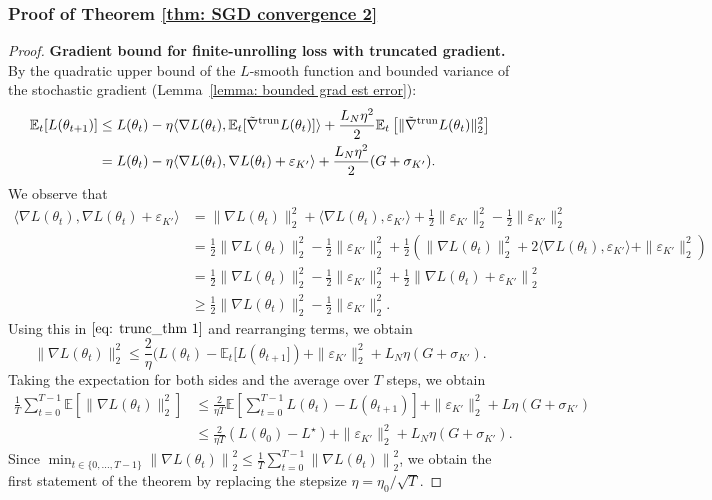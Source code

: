 \documentclass{article}
\def\E{\mathbb{E}}
\def\tgrad{\Tilde{\nabla}}
\def\trun{\mathrm{trun}}
\begin{document}
\subsubsection{Proof of Theorem \ref{thm: SGD convergence 2}}
\begin{proof}
    \textbf{Gradient bound for finite-unrolling loss with truncated gradient.}
    By the quadratic upper bound of the $L$-smooth function and bounded variance of the stochastic gradient (Lemma~\ref{lemma: bounded grad est error}):
    \begin{align}\label{eq: trunc_thm 1}
        \E_t [L(\theta_{t+1})] &\leq L(\theta_t) -\eta \langle \nabla L(\theta_t), \E_t[\tgrad^\trun L(\theta_t)] \rangle + \frac{L_N \eta^2}{2} \E_t \left[\| \tgrad^\trun L(\theta_t) \|^2_2\right] \nonumber\\
        &= L(\theta_t) -  \eta \langle \nabla L(\theta_t), \nabla L(\theta_t) + \varepsilon_{K'} \rangle + \frac{L_N \eta^2}{2} (G +\sigma_{K'}).
    \end{align}
    We observe that 
    \begin{align*}
        \langle \nabla L(\theta_t), \nabla L(\theta_t) + \varepsilon_{K'} \rangle
        &= \|\nabla L(\theta_t) \|^2_2 + \langle  \nabla L(\theta_t), \varepsilon_{K'} \rangle + \frac{1}{2}\|\varepsilon_{K'} \|^2_2 - \frac{1}{2}\|\varepsilon_{K'}\|^2_2\\
        &= \frac{1}{2}\|\nabla L(\theta_t) \|^2_2 - \frac{1}{2}\|\varepsilon_{K'}\|^2_2 + \frac{1}{2} \left(\|\nabla L(\theta_t) \|^2_2 + 2\langle  \nabla L(\theta_t), \varepsilon_{K'} \rangle +\|\varepsilon_{K'}\|^2_2 \right) \\
        &= \frac{1}{2}\|\nabla L(\theta_t) \|^2_2 - \frac{1}{2}\|\varepsilon_{K'}\|^2_2 + \frac{1}{2}\left\| \nabla L(\theta_t) + \varepsilon_{K'} \right\|^2_2\\
        &\geq \frac{1}{2}\|\nabla L(\theta_t) \|^2_2 - \frac{1}{2}\|\varepsilon_{K'}\|^2_2.
    \end{align*}
    Using this in $\eqref{eq: trunc_thm 1}$ and rearranging terms, we obtain 
    \[
    \| \nabla L(\theta_t) \|^2_2 \leq \frac{2}{\eta} (L (\theta_t) - \E_t[L(\theta_{t+1}]) + \| \varepsilon_{K'} \|^2_2 + L_N \eta (G + \sigma_{K'}).
    \]
    Taking the expectation for both sides and the average over $T$ steps, we obtain
    \begin{align*}
        \frac{1}{T}\sum_{t=0}^{T-1} \E [\| \nabla L(\theta_t) \|^2_2] &\leq \frac{2}{\eta T} \E \left[ \sum_{t=0}^{T-1} L(\theta_t) - L(\theta_{t+1}) \right] + \| \varepsilon_{K'} \|^2_2 + L \eta (G + \sigma_{K'}) \\
        &\leq \frac{2}{\eta T} \left(L(\theta_0) - L^\star \right) + \| \varepsilon_{K'} \|^2_2 + L_N \eta (G + \sigma_{K'}).
    \end{align*}
    Since $\min_{t \in \{0, \dots, T-1\}} \left\| \nabla L(\theta_t) \right\|^2_2 \leq  \frac{1}{T} \sum_{t=0}^{T-1} \left\| \nabla L(\theta_t) \right\|^2_2$, we obtain the first statement of the theorem by replacing the stepsize $\eta = \eta_0 / \sqrt{T}$.


\end{proof}
\end{document}

